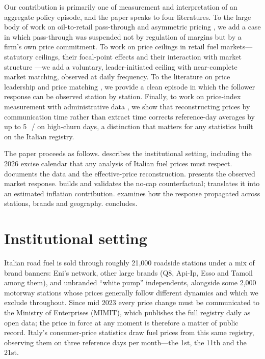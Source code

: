 \documentclass[11pt]{article}
\newcommand{\cl}{\,\text{c}/\text{l}}
\begin{document}
Our contribution is primarily one of measurement and interpretation of an
aggregate policy episode, and the paper speaks to four literatures. To the
large body of work on oil-to-retail pass-through and asymmetric pricing
\parencite{tappata2009, atil2013, borenstein2002, bettendorf2003}, we add a
case in which pass-through was suspended not by regulation of margins but
by a firm's own price commitment. To work on price ceilings in retail fuel
markets---statutory ceilings, their focal-point effects and their
interaction with market structure
\parencite{carranza2015, sen2011, zhang2020, contin1999, gatsios2026,
quiguanas2025}---we add a voluntary, leader-initiated ceiling with
near-complete market matching, observed at daily frequency. To the
literature on price leadership and price matching
\parencite{atkinson2008, amir2007, kim2019, pellegrino2025}, we provide a
clean episode in which the follower response can be observed station by
station. Finally, to work on price-index measurement with administrative
data \parencite{rossi2015, pennerstorfer2020}, we show that reconstructing
prices by communication time rather than extract time corrects
reference-day averages by up to 5~\cl{} on high-churn days, a distinction
that matters for any statistics built on the Italian registry.

The paper proceeds as follows.  describes the
institutional setting, including the 2026 excise calendar that any analysis
of Italian fuel prices must respect.  documents the data and
the effective-price reconstruction.  presents the
observed market response.  builds and validates
the no-cap counterfactual;  translates it into an
estimated inflation contribution.  examines how the
response propagated across stations, brands and geography.
 concludes.

\section{Institutional setting}\label{sec:setting}

Italian road fuel is sold through roughly 21{,}000 roadside
stations under a mix of brand banners: Eni's network,
 other large brands (Q8, Api-Ip, Esso and
Tamoil among them), and unbranded ``white pump'' independents, alongside
some 2{,}000 motorway stations whose prices generally follow different dynamics
and which we exclude throughout. Since mid 2023 every price change must be
communicated to the Ministry of Enterprises (MIMIT), which publishes the
full registry daily as open data; the price in force at any moment is
therefore a matter of public record. Italy's consumer-price statistics
draw fuel prices from this same registry, observing them on three
reference days per month---the 1st, the 11th and the 21st.
\end{document}
